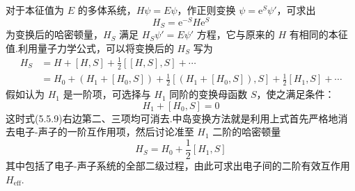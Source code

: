 对于本征值为 $E$ 的多体系统，$H\psi=E\psi$，作正则变换 $\psi=\mathrm{e}^{S}\psi'$，可求出
\begin{equation}
  H_S=\mathrm{e}^{-S}H\mathrm{e}^{S}
\end{equation}
为变换后的哈密顿量，$H_S$ 满足 $H_S\psi'=E\psi'$ 方程，它与原来的 $H$ 有相同的本征值.利用量子力学公式，可以将变换后的 $H_S$ 写为
\begin{equation}
\begin{aligned}
  H_S&=H+\left[H,S\right]+\frac{1}{2}\left[\left[H,S\right],S\right]+\cdots\\
  &=H_0+\left(H_1+\left[H_0,S\right]\right)
  +\frac{1}{2}\left[\left(H_1+\left[H_0,S\right]\right),S\right]
  +\frac{1}{2}\left[H_1,S\right]+\cdots
\end{aligned}
\end{equation}
假如认为 $H_1$ 是一阶项，可选择与 $H_1$ 同阶的变换母函数 $S$，使之满足条件：
\begin{equation}
  H_1+\left[H_0,S\right]=0
\end{equation}
这时式(5.5.9)右边第二、三项均可消去.中岛变换方法就是利用上式首先严格地消去电子-声子的一阶互作用项，然后讨论准至 $H_1$ 二阶的哈密顿量
\begin{equation}
  H_S=H_0+\frac{1}{2}\left[H_1,S\right]
\end{equation}
其中包括了电子-声子系统的全部二级过程，由此可求出电子间的二阶有效互作用 $H_{\mathrm{eff}}$.

